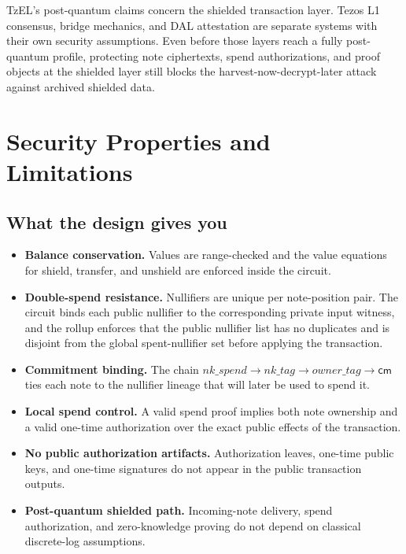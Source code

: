 \documentclass[11pt]{article}
\newcommand{\TzEL}{TzEL}
\newcommand{\cm}{\mathsf{cm}}
\begin{document}
\TzEL{}'s post-quantum claims concern the shielded transaction layer. Tezos L1
consensus, bridge mechanics, and DAL attestation are separate systems with
their own security assumptions. Even before those layers reach a fully
post-quantum profile, protecting note ciphertexts, spend authorizations, and
proof objects at the shielded layer still blocks the harvest-now-decrypt-later
attack against archived shielded data.

\section{Security Properties and Limitations}

\subsection{What the design gives you}

\begin{itemize}
  \item \textbf{Balance conservation.} Values are range-checked and the value
        equations for shield, transfer, and unshield are enforced inside the
        circuit.
  \item \textbf{Double-spend resistance.} Nullifiers are unique per
        note-position pair. The circuit binds each public nullifier to the
        corresponding private input witness, and the rollup enforces that the
        public nullifier list has no duplicates and is disjoint from the global
        spent-nullifier set before applying the transaction.
  \item \textbf{Commitment binding.} The chain
        \(nk\_spend \rightarrow nk\_tag \rightarrow owner\_tag \rightarrow \cm\)
        ties each note to the nullifier lineage that will later be used to
        spend it.
  \item \textbf{Local spend control.} A valid spend proof implies both note
        ownership and a valid one-time authorization over the exact public
        effects of the transaction.
  \item \textbf{No public authorization artifacts.} Authorization leaves,
        one-time public keys, and one-time signatures do not appear in the
        public transaction outputs.
  \item \textbf{Post-quantum shielded path.} Incoming-note delivery, spend
        authorization, and zero-knowledge proving do not depend on classical
        discrete-log assumptions.
\end{itemize}
\end{document}
